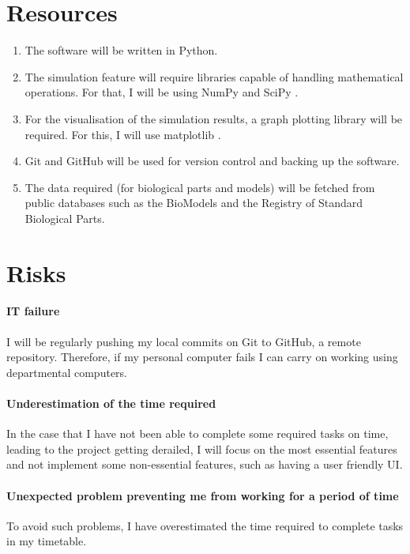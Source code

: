 \documentclass{article}
\begin{document}
	\section{Resources}
	\begin{enumerate}
		\item The software will be written in Python.
		\item The simulation feature will require libraries capable of handling mathematical operations. For that, I will be using NumPy \cite{numpy} and SciPy \cite{scipy}.
		\item For the visualisation of the simulation results, a graph plotting library will be required. For this, I will use matplotlib \cite{matplotlib}.
		\item Git and GitHub will be used for version control and backing up the software.
		\item The data required (for biological parts and models) will be fetched from public databases such as the BioModels \cite{biomodels} and the Registry of Standard Biological Parts. \cite{rsbp}
	\end{enumerate}

	\section{Risks}
	\paragraph{IT failure} I will be regularly pushing my local commits on Git to GitHub, a remote repository. Therefore, if my personal computer fails I can carry on working using departmental computers.
	\paragraph{Underestimation of the time required} In the case that I have not been able to complete some required tasks on time, leading to the project getting derailed, I will focus on the most essential features and not implement some non-essential features, such as having a user friendly UI.
	\paragraph{Unexpected problem preventing me from working for a period of time} To avoid such problems, I have overestimated the time required to complete tasks in my timetable.
	
	
\end{document}
